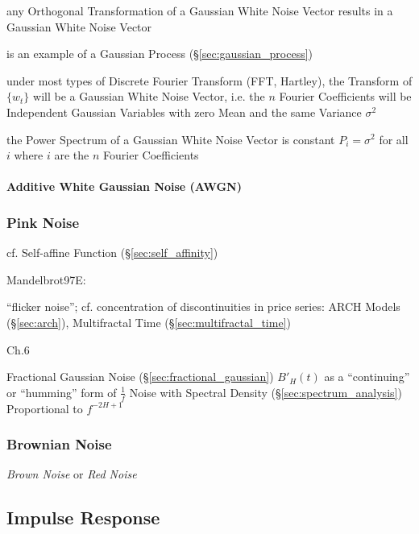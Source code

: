 any Orthogonal Transformation of a Gaussian White Noise Vector results in a
Gaussian White Noise Vector

is an example of a Gaussian Process (\S\ref{sec:gaussian_process})

under most types of Discrete Fourier Transform (FFT, Hartley), the Transform of
$\{ w_t \}$ will be a Gaussian White Noise Vector, i.e. the $n$ Fourier
Coefficients will be Independent Gaussian Variables with zero Mean and the same
Variance $\sigma^2$

the Power Spectrum of a Gaussian White Noise Vector is constant $P_i = \sigma^2$
for all $i$ where $i$ are the $n$ Fourier Coefficients



\paragraph{Additive White Gaussian Noise (AWGN)}\label{sec:awgn}\hfill



\subsubsection{Pink Noise}\label{sec:pink_noise}

cf. Self-affine Function (\S\ref{sec:self_affinity})

Mandelbrot97E:

``flicker noise''; cf. concentration of discontinuities in price series: ARCH
Models (\S\ref{sec:arch}), Multifractal Time (\S\ref{sec:multifractal_time})

Ch.6

Fractional Gaussian Noise (\S\ref{sec:fractional_gaussian}) $B'_H(t)$ as a
``continuing'' or ``humming'' form of $\frac{1}{f}$ Noise with Spectral Density
(\S\ref{sec:spectrum_analysis}) Proportional to $f^{-2H+1}$



\subsubsection{Brownian Noise}\label{sec:brownian_noise}

\emph{Brown Noise} or \emph{Red Noise}



\subsection{Impulse Response}\label{sec:impulse_response}

